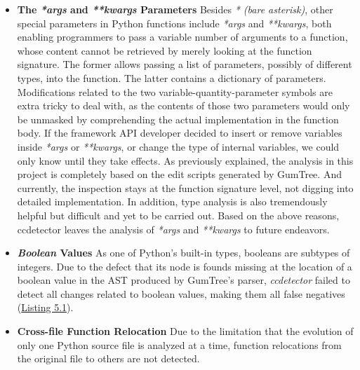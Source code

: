 \begin{itemize}
    \item \textbf{The \textit{*args} and \textit{**kwargs} Parameters} Besides \textit{* (bare asterisk)}, other special parameters in Python functions include \textit{*args} and \textit{**kwargs}, both enabling programmers to pass a variable number of arguments to a function, whose content cannot be retrieved by merely looking at the function signature. The former allows passing a list of parameters, possibly of different types, into the function. The latter contains a dictionary of parameters. Modifications related to the two variable-quantity-parameter symbols are extra tricky to deal with, as the contents of those two parameters would only be unmasked by comprehending the actual implementation in the function body. If the framework API developer decided to insert or remove variables inside \textit{*args} or \textit{**kwargs}, or change the type of internal variables, we could only know until they take effects.  As previously explained, the analysis in this project is completely based on the edit scripts generated by GumTree. And currently, the inspection stays at the function signature level, not digging into detailed implementation. In addition, type analysis is also tremendously helpful but difficult and yet to be carried out. Based on the above reasons, ccdetector leaves the analysis of \textit{*args} and \textit{**kwargs} to future endeavors.
    \item \textbf{\textit{Boolean} Values} As one of Python's built-in types, booleans are subtypes of integers. Due to the defect that its node is founds missing at the location of a boolean value in the AST produced by GumTree's parser, \textit{ccdetector} failed to detect all changes related to boolean values, making them all false negatives (\hyperref[lst:bool-change]{Listing 5.1}).
    \item \textbf{Cross-file Function Relocation} Due to the limitation that the evolution of only one Python source file is analyzed at a time, function relocations from the original file to others are not detected.
\end{itemize}

\begin{figure}[!t]
    
    \vspace{-5mm}
\end{figure}
